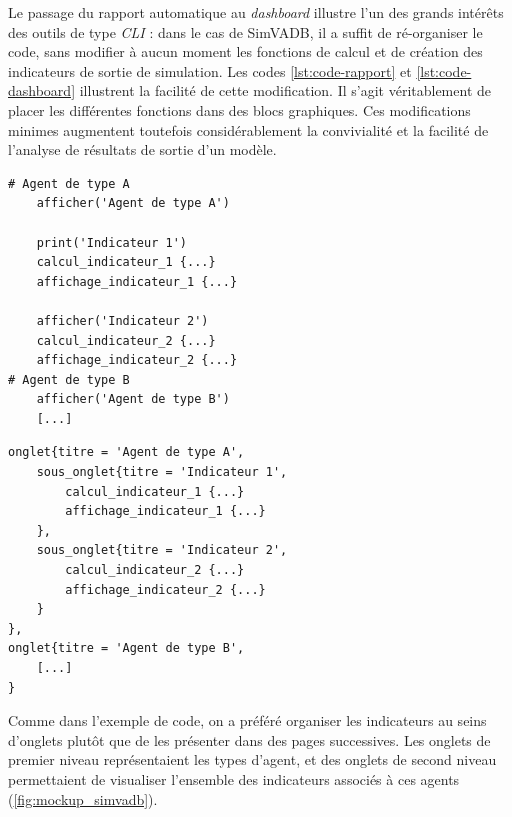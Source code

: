 Le passage du rapport automatique au \textit{dashboard} illustre l'un des grands intérêts des outils de type \textit{CLI} : dans le cas de SimVADB, il a suffit de ré-organiser le code, sans modifier à aucun moment les fonctions de calcul et de création des indicateurs de sortie de simulation.
Les codes \ref{lst:code-rapport} et \ref{lst:code-dashboard} illustrent la facilité de cette modification.
Il s'agit véritablement de placer les différentes fonctions dans des blocs graphiques.
Ces modifications minimes augmentent toutefois considérablement la convivialité et la facilité de l'analyse de résultats de sortie d'un modèle.

\clearpage

\lstset{frame=shadowbox, tabsize=2, basicstyle=\ttfamily\footnotesize}
\noindent\begin{minipage}[t]{.44\textwidth}
		\begin{lstlisting}[caption={Pseudo-code du rapport automatique.},frame=tlrb, captionpos=b, label = {lst:code-rapport}]
# Agent de type A
	afficher('Agent de type A')
	
	print('Indicateur 1')
	calcul_indicateur_1 {...}
	affichage_indicateur_1 {...}
	
	afficher('Indicateur 2')
	calcul_indicateur_2 {...}
	affichage_indicateur_2 {...}
# Agent de type B
	afficher('Agent de type B')
	[...]
		\end{lstlisting}
\end{minipage} \hspace{.1em}
\begin{minipage}[t]{.53\textwidth}
		\begin{lstlisting}[caption={Pseudo-code du dashboard.},frame=tlrb, captionpos=b, label = {lst:code-dashboard}]
onglet{titre = 'Agent de type A',
	sous_onglet{titre = 'Indicateur 1',
		calcul_indicateur_1 {...}
		affichage_indicateur_1 {...}
	},
	sous_onglet{titre = 'Indicateur 2',
		calcul_indicateur_2 {...}
		affichage_indicateur_2 {...}
	}
},
onglet{titre = 'Agent de type B',
	[...]
}
		\end{lstlisting}
\end{minipage}

Comme dans l'exemple de code, on a préféré organiser les indicateurs au seins d'onglets plutôt que de les présenter dans des pages successives.
Les onglets de premier niveau représentaient les types d'agent, et des onglets de second niveau permettaient de visualiser l'ensemble des indicateurs associés à ces agents (\cref{fig:mockup_simvadb}).


